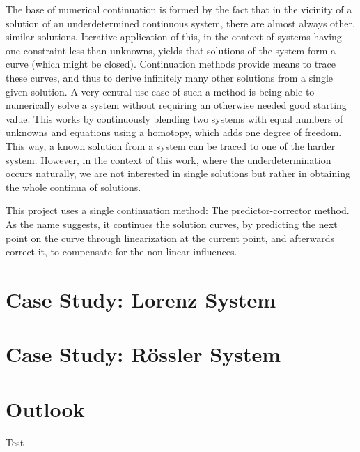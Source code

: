 \documentclass[a4paper,oneside,10pt]{article}
\let\oldsection\section
\renewcommand\section{\clearpage\oldsection}
\begin{document}
The base of numerical continuation is formed by the fact that in the vicinity of a solution of an underdetermined continuous system, there are almost always other, similar solutions.
Iterative application of this, in the context of systems having one constraint less than unknowns, yields that solutions of the system form a curve (which might be closed).
Continuation methods provide means to trace these curves, and thus to derive infinitely many other solutions from a single given solution.
A very central use-case of such a method is being able to numerically solve a system without requiring an otherwise needed good starting value.
This works by continuously blending two systems with equal numbers of unknowns and equations using a homotopy, which adds one degree of freedom.
This way, a known solution from a system can be traced to one of the harder system.
However, in the context of this work, where the underdetermination occurs naturally, we are not interested in single solutions but rather in obtaining the whole continua of solutions.

This project uses a single continuation method: The predictor-corrector method.
As the name suggests, it continues the solution curves, by predicting the next point on the curve through linearization at the current point, and afterwards correct it, to compensate for the non-linear influences.




\section{Case Study: Lorenz System}


\section{Case Study: Rössler System}


\section{Outlook}

Test \cite{allgower1990numerical}




{}

\end{document}
